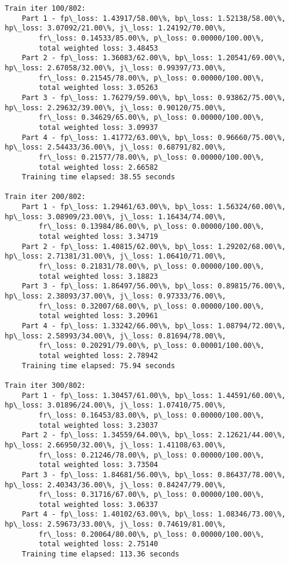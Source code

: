\documentclass[11pt]{article}
\begin{document}
\begin{Verbatim}[commandchars=\\\{\}]
Train iter 100/802:
	Part 1 - fp\_loss: 1.43917/58.00\%, bp\_loss: 1.52138/58.00\%, hp\_loss: 3.07092/21.00\%, j\_loss: 1.24192/70.00\%, 
		fr\_loss: 0.14533/85.00\%, p\_loss: 0.00000/100.00\%, 
		total weighted loss: 3.48453
	Part 2 - fp\_loss: 1.36083/62.00\%, bp\_loss: 1.20541/69.00\%, hp\_loss: 2.67058/32.00\%, j\_loss: 0.99397/73.00\%, 
		fr\_loss: 0.21545/78.00\%, p\_loss: 0.00000/100.00\%, 
		total weighted loss: 3.05263
	Part 3 - fp\_loss: 1.76279/59.00\%, bp\_loss: 0.93862/75.00\%, hp\_loss: 2.29632/39.00\%, j\_loss: 0.90120/75.00\%, 
		fr\_loss: 0.34629/65.00\%, p\_loss: 0.00000/100.00\%, 
		total weighted loss: 3.09937
	Part 4 - fp\_loss: 1.41772/63.00\%, bp\_loss: 0.96660/75.00\%, hp\_loss: 2.54433/36.00\%, j\_loss: 0.68791/82.00\%, 
		fr\_loss: 0.21577/78.00\%, p\_loss: 0.00000/100.00\%, 
		total weighted loss: 2.66582
	Training time elapsed: 38.55 seconds

Train iter 200/802:
	Part 1 - fp\_loss: 1.29461/63.00\%, bp\_loss: 1.56324/60.00\%, hp\_loss: 3.08909/23.00\%, j\_loss: 1.16434/74.00\%, 
		fr\_loss: 0.13984/86.00\%, p\_loss: 0.00000/100.00\%, 
		total weighted loss: 3.34719
	Part 2 - fp\_loss: 1.40815/62.00\%, bp\_loss: 1.29202/68.00\%, hp\_loss: 2.71381/31.00\%, j\_loss: 1.06410/71.00\%, 
		fr\_loss: 0.21831/78.00\%, p\_loss: 0.00000/100.00\%, 
		total weighted loss: 3.18823
	Part 3 - fp\_loss: 1.86497/56.00\%, bp\_loss: 0.89815/76.00\%, hp\_loss: 2.38093/37.00\%, j\_loss: 0.97333/76.00\%, 
		fr\_loss: 0.32007/68.00\%, p\_loss: 0.00000/100.00\%, 
		total weighted loss: 3.20961
	Part 4 - fp\_loss: 1.33242/66.00\%, bp\_loss: 1.08794/72.00\%, hp\_loss: 2.58993/34.00\%, j\_loss: 0.81694/78.00\%, 
		fr\_loss: 0.20291/79.00\%, p\_loss: 0.00001/100.00\%, 
		total weighted loss: 2.78942
	Training time elapsed: 75.94 seconds

Train iter 300/802:
	Part 1 - fp\_loss: 1.30457/61.00\%, bp\_loss: 1.44591/60.00\%, hp\_loss: 3.01896/24.00\%, j\_loss: 1.07410/75.00\%, 
		fr\_loss: 0.16453/83.00\%, p\_loss: 0.00000/100.00\%, 
		total weighted loss: 3.23037
	Part 2 - fp\_loss: 1.34559/64.00\%, bp\_loss: 2.12621/44.00\%, hp\_loss: 2.66950/32.00\%, j\_loss: 1.41108/63.00\%, 
		fr\_loss: 0.21246/78.00\%, p\_loss: 0.00000/100.00\%, 
		total weighted loss: 3.73504
	Part 3 - fp\_loss: 1.84681/56.00\%, bp\_loss: 0.86437/78.00\%, hp\_loss: 2.40343/36.00\%, j\_loss: 0.84247/79.00\%, 
		fr\_loss: 0.31716/67.00\%, p\_loss: 0.00000/100.00\%, 
		total weighted loss: 3.06337
	Part 4 - fp\_loss: 1.40102/63.00\%, bp\_loss: 1.08346/73.00\%, hp\_loss: 2.59673/33.00\%, j\_loss: 0.74619/81.00\%, 
		fr\_loss: 0.20064/80.00\%, p\_loss: 0.00000/100.00\%, 
		total weighted loss: 2.75140
	Training time elapsed: 113.36 seconds


\end{Verbatim}
\end{document}
